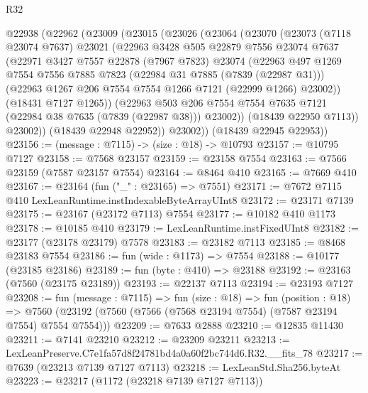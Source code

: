 \begin{lexlean}{R32}
\begin{coremodule}
  @22938
    (@22962
      (@23009
        (@23015
          (@23026
            (@23064
              (@23070
                (@23073
                  (@7118 @23074 @7637)
                  @23021
                  (@22963
                    @3428
                    @505
                    @22879
                    @7556
                    @23074
                    @7637
                    (@22971
                      @3427
                      @7557
                      @22878
                      (@7967 @7823)
                      @23074
                      (@22963
                        @497
                        @1269
                        @7554
                        @7556
                        @7885
                        @7823
                        (@22984 @31 @7885 (@7839 (@22987 @31)))
                        (@22963 @1267 @206 @7554 @7554 @1266 @7121 (@22999 @1266) @23002))
                      (@18431 @7127 @1265))
                    (@22963
                      @503
                      @206
                      @7554
                      @7554
                      @7635
                      @7121
                      (@22984 @38 @7635 (@7839 (@22987 @38)))
                      @23002))
                  (@18439 @22950 @7113))
                @23002))
            (@18439 @22948 @22952))
          @23002))
      (@18439 @22945 @22953))
@23156 := (message : @7115) -> (size : @18) -> @10793
@23157 := @10795 @7127
@23158 := @7568 @23157
@23159 := @23158 @7554
@23163 := @7566 @23159 (@7587 @23157 @7554)
@23164 := @8464 @410
@23165 := @7669 @410
@23167 := @23164 (fun ("_" : @23165) => @7551)
@23171 := @7672 @7115 @410 LexLeanRuntime.instIndexableByteArrayUInt8
@23172 := @23171 @7139
@23175 := @23167 (@23172 @7113) @7554
@23177 := @10182 @410 @1173
@23178 := @10185 @410
@23179 := LexLeanRuntime.instFixedUInt8
@23182 := @23177 (@23178 @23179) @7578
@23183 := @23182 @7113
@23185 := @8468 @23183 @7554
@23186 := fun (wide : @1173) => @7554
@23188 := @10177 (@23185 @23186)
@23189 := fun (byte : @410) => @23188
@23192 := @23163 (@7560 (@23175 @23189))
@23193 := @22137 @7113
@23194 := @23193 @7127
@23208 := fun (message : @7115) =>
  fun (size : @18) =>
  fun (position : @18) =>
  @7560 (@23192 (@7560 (@7566 (@7568 @23194 @7554) (@7587 @23194 @7554) @7554 @7554)))
@23209 := @7633 @2888
@23210 := @12835 @11430
@23211 := @7141 @23210
@23212 := @23209 @23211
@23213 := LexLeanPreserve.C7e1fa57d8f24781bd4a0a60f2bc744d6.R32.__fits_78
@23217 := @7639 (@23213 @7139 @7127 @7113)
@23218 := LexLeanStd.Sha256.byteAt
@23223 := @23217 (@1172 (@23218 @7139 @7127 @7113))

\end{coremodule}
\end{lexlean}

